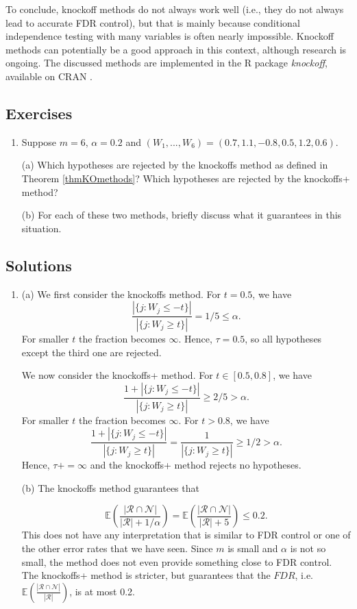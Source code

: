 \documentclass[11pt]{article}
\theoremstyle{plain}
\theoremstyle{definition}
\newcommand{\N}{\mathcal{N}}
\newcommand{\R}{\mathcal{R}}
\newcommand{\citp}{\citep}
\begin{document}
To conclude, knockoff methods do not always work well (i.e., they do not always lead to accurate FDR control), but that is mainly because  conditional independence testing with many variables is often nearly impossible. Knockoff methods can potentially be a good approach in this context, although research is ongoing. The discussed methods are implemented in the R package \emph{knockoff}, available on CRAN \citp{knockoff}.




\subsection{Exercises}
\begin{enumerate}
\item
Suppose $m=6$, $\alpha=0.2$ and $(W_1,...,W_6)=(0.7, 1.1 ,-0.8 ,0.5 ,1.2,0.6)$. 

(a) Which hypotheses are rejected by the knockoffs method as defined in Theorem \ref{thmKOmethods}? Which hypotheses are rejected by the knockoffs+ method?

(b) For each of these two methods, briefly discuss what it guarantees  in this situation.
\end{enumerate}


\begin{sols}
\subsection{Solutions}
\begin{enumerate}
\item
(a) We first consider the  knockoffs method. For $t=0.5$, we have 
$$\frac{|\{j: W_j\leq -t\}|}{|\{j: W_j\geq t\}|} = 1/5 \leq \alpha.$$ For smaller $t$ the fraction becomes $\infty$. Hence, $\tau=0.5$, so all hypotheses except the third one are rejected.

We now consider the  knockoffs+ method. For $t\in [0.5,0.8]$, we have 
$$\frac{1+ |\{j: W_j\leq -t\}|}{|\{j: W_j\geq t\}|} \geq 2/5 > \alpha.$$ For smaller $t$ the fraction becomes $\infty$. 
For  $t>0.8$, we have 
$$\frac{1+ |\{j: W_j\leq -t\}|}{|\{j: W_j\geq t\}|} = \frac{1}{|\{j: W_j\geq t\}|} \geq 1/2 > \alpha.$$ Hence, $\tau+=\infty$ and the knockoffs+ method rejects no hypotheses.

(b) The knockoffs method guarantees that 

$$\mathbb{E}(\frac{|\R\cap\N|}{|\R|+1/\alpha}) =\mathbb{E}(\frac{|\R\cap\N|}{|\R|+5}) \leq 0.2.$$
This does not have any interpretation that is similar to FDR control or one of the other error rates that we have seen. Since $m$ is small and $\alpha$ is not so small, the method does not even provide something close to FDR control. The knockoffs+ method is stricter, but guarantees that the $FDR$, i.e. $\mathbb{E}(\frac{|\R\cap\N|}{|\R|})$, is at most 0.2.
\end{enumerate}
\end{sols}
\end{document}
